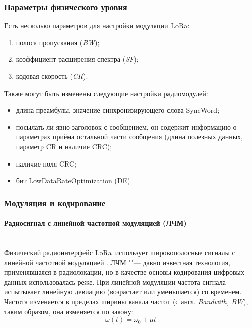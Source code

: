 \subsubsection{Параметры физического уровня} 

Есть несколько параметров для настройки модуляции LoRa\texttrademark: 
\begin{enumerate}
	\item полоса пропускания (\textit{BW}); 
	\item коэффициент расширения спектра (\textit{SF}); 
	\item кодовая скорость (\textit{CR}).
\end{enumerate}

Также могут быть изменены следующие настройки радиомодулей:
\begin{itemize}
	\item длина преамбулы, значение синхронизирующего слова SyncWord;
	\item посылать ли явно заголовок с сообщением, он содержит информацию о 
параметрах приёма остальной части сообщения (длина полезных данных, параметр CR 
и наличие CRC);
	\item наличие поля CRC;
	\item бит LowDataRateOptimization (DE).
\end{itemize}

\subsubsection{Модуляция и кодирование}

\paragraph{Радиосигнал с линейной частотной модуляцией (ЛЧМ)} \hspace{0pt}\\

Физический радиоинтерфейс LoRa\texttrademark~использует широкополосные сигналы 
с линейной 
частотной модуляцией \cite{augustin2016}. 
ЛЧМ ""--- давно известная технология, применявшаяся в радиолокации, но в 
качестве основы кодирования цифровых данных использовалась реже.
При линейной модуляции частота сигнала испытывает линейную девиацию (возрастает 
или уменьшается) со временем. 
Частота изменяется в пределах ширины канала частот (с англ. \textit{Bandwith, 
BW}), таким образом, она изменяется по закону:
\begin{equation}
	\omega(t) = \omega_0 + \mu t
\end{equation}

